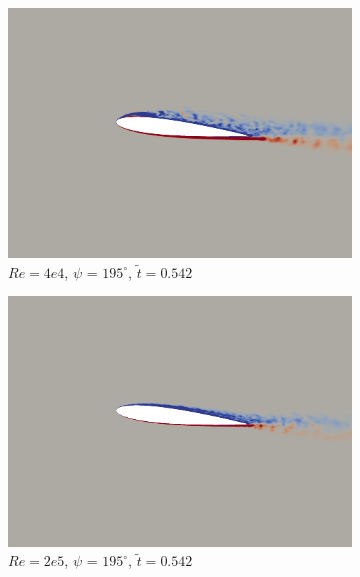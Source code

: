 \begin{figure}[H]
	\centering
	
	\begin{subfigure}[b]{0.32\textwidth}
		\centering
		\includegraphics[width=1\textwidth]{figures/Vorticity_plots/Re_40k_1pt2/phase_195.png}
		\caption{$Re= 4e4$, $\psi$ = $195^\circ$, $\tilde{t}=0.542$}
		\label{fig:Re_40k_1pt2_phi195}
	\end{subfigure}
	\begin{subfigure}[b]{0.32\textwidth}
		\centering
		\includegraphics[width=1\textwidth]{figures/Vorticity_plots/Re_200k_1pt2/phase_195.png}
		\caption{$Re=2e5$, $\psi$ = $195^\circ$, $\tilde{t}=0.542$}
		\label{fig:Re_200k_1pt2_phi195}
	\end{subfigure}
	\begin{subfigure}[b]{0.32\textwidth}

\end{subfigure}
\end{figure}

